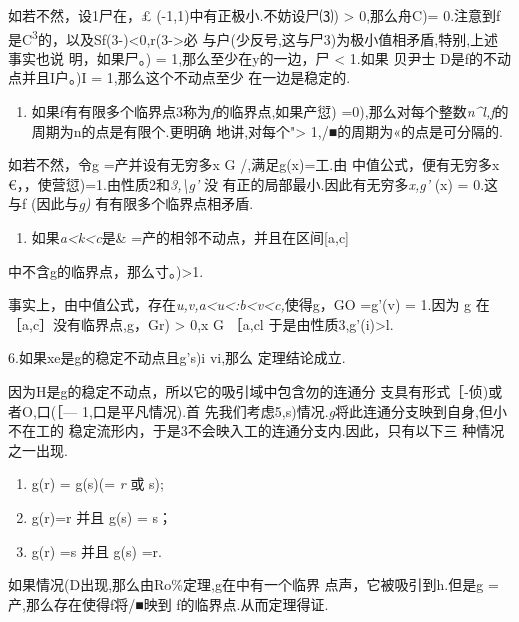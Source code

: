 如若不然，设1尸\textbar{}在，£ (-1,1)中有正极小.不妨设尸⑶)
\textgreater{} 0,那么舟C)=
0.注意到f是C\textsuperscript{3}的，以及Sf(3-)\textless{}0,r(3-\textgreater{}必
与户(少反号,这与尸3)为极小值相矛盾,特别,上述事实也说
明，如果\textbar{}尸。)\textbar{} =
1,那么至少在y的一边，\textbar{}尸\textbar{} \textless{} 1.如果 贝尹士
D是f的不动点并且I户。)I = 1,那么这个不动点至少 在一边是稳定的.

\begin{enumerate}
\def\labelenumi{\arabic{enumi}.}
\setcounter{enumi}{3}
\item
  如果f有有限多个临界点3称为\emph{f}的临界点,如果产愆)
  =0),那么对每个整数\emph{n\^{}l,f}的周期为n的点是有限个.更明确
  地讲,对每个"\textgreater{} 1,/■的周期为«的点是可分隔的.
\end{enumerate}

如若不然，令g =产并设有无穷多x G /,满足g(x)=工.由 中值公式，便有无穷多x
€，，使营愆)=1.由性质2和\emph{3,\textbackslash{}g'} \textbar{}没
有正的局部最小.因此有无穷多\emph{x,g'} (x) = 0.这与f (因此与\emph{g)}
有有限多个临界点相矛盾.

\begin{enumerate}
\def\labelenumi{\arabic{enumi}.}
\setcounter{enumi}{4}
\item
  如果\emph{a\textless{}k\textless{}c}是\&
  =产的相邻不动点，并且在区间{[}a,c{]}
\end{enumerate}

中不含g的临界点，那么寸。)\textgreater{}1.

事实上，由中值公式，存在\emph{u,v,a\textless{}u\textless{}:b\textless{}v\textless{}c,}使得g，GO
=g'(v) = 1.因为 g 在［a,c］没有临界点,g，Gr) \textgreater{} 0,x G ［a,cl
于是由性质3,g'(i)\textgreater{}l.

6.如果xe是g的稳定不动点且\textbar{}g's)i vi,那么 定理结论成立.

因为H是g的稳定不动点，所以它的吸引域中包含勿的连通分
支具有形式［-侦)或者O,口(［--- 1,口是平凡情况).首
先我们考虑5,s)情况.\emph{g}将此连通分支映到自身,但小不在工的
稳定流形内，于是3不会映入工的连通分支内.因此，只有以下三 种情况之一出现.

\begin{enumerate}
\def\labelenumi{(\roman{enumi})}
\item
  g(r) = g(s)(= \emph{r} 或 s);
\item
  g(r)=r 并且 g(s) = s；
\item
  g(r) =s 并且 g(s) =r.
\end{enumerate}

如果情况(D出现,那么由Ro\%定理,g在中有一个临界 点声，它被吸引到h.但是g
=产,那么存在使得f将/■映到 f的临界点.从而定理得证.

